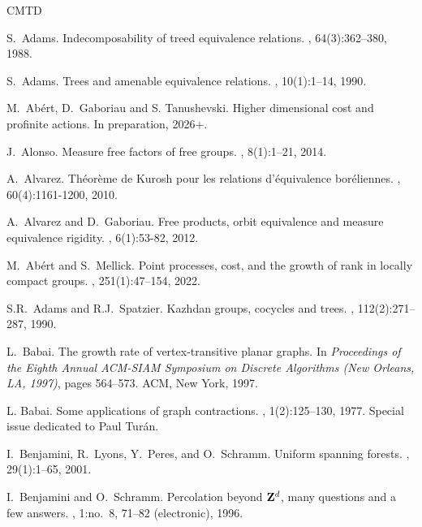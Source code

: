 \documentclass[11pt]{amsart}
\theoremstyle{definition}
\theoremstyle{plain}
\newcommand{\<}{\langle}
\renewcommand{\>}{\rangle}
\begin{document}
\begin{thebibliography}{CMTD}

{}S.~Adams.
\newblock Indecomposability of treed equivalence relations.
, 64(3):362--380, 1988.

{}S.~Adams.
\newblock Trees and amenable equivalence relations.
, 10(1):1--14, 1990.

M.~Ab{\'e}rt, D.~Gaboriau and S. Tanushevski.
\newblock Higher dimensional cost and profinite actions.
\newblock In preparation, 2026+.

J.~Alonso.
\newblock Measure free factors of free groups.
, 8(1):1--21, 2014.

A.~Alvarez.
\newblock Th{\'e}or{\`e}me de Kurosh pour les relations d’{\'e}quivalence bor{\'e}liennes.
, 60(4):1161-1200, 2010.

A.~Alvarez and D.~Gaboriau.
\newblock Free products, orbit equivalence and measure equivalence rigidity.
, 6(1):53-82, 2012.

M.~Ab{\'e}rt and S.~Mellick.
\newblock Point processes, cost, and the growth of rank in locally compact
  groups.
, 251(1):47--154, 2022.


S.R.~Adams and R.J.~Spatzier.
\newblock Kazhdan groups, cocycles and trees.
, 112(2):271--287, 1990.

L.~Babai.
\newblock The growth rate of vertex-transitive planar graphs.
\newblock In {\em Proceedings of the Eighth Annual ACM-SIAM Symposium on Discrete
  Algorithms ({N}ew {O}rleans, {LA}, 1997)}, pages 564--573. ACM, New York, 1997.

L. Babai.
\newblock Some applications of graph contractions.
, 1(2):125--130, 1977.
\newblock Special issue dedicated to Paul Tur{\'a}n.


I.~Benjamini, R.~Lyons, Y.~Peres, and O.~Schramm.
\newblock Uniform spanning forests.
, 29(1):1--65, 2001.

I.~Benjamini and O.~Schramm.
\newblock Percolation beyond $\mathbf{Z}\sp d$, many questions and a few
  answers.
, 1:no.\ 8, 71--82 (electronic), 1996.


\end{thebibliography}
\end{document}
